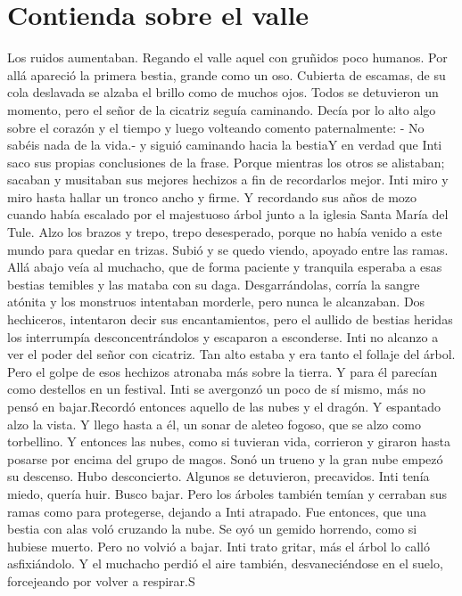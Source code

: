 
\chapter{Contienda sobre el valle}

Los ruidos aumentaban. Regando el valle aquel con gruñidos poco humanos. Por allá apareció la primera bestia, grande como un oso. Cubierta de escamas, de su cola deslavada se alzaba el brillo como de muchos ojos. Todos se detuvieron un momento, pero el señor de la cicatriz seguía caminando. Decía por lo alto algo sobre el corazón y el tiempo y luego volteando comento paternalmente: - No sabéis nada de la vida.- y siguió caminando hacia la bestiaY en verdad que Inti saco sus propias conclusiones de la frase. Porque mientras los otros se alistaban; sacaban y musitaban sus mejores hechizos a fin de recordarlos mejor. Inti miro y miro hasta hallar un tronco ancho y firme. Y recordando sus años de mozo cuando  había escalado por el majestuoso árbol junto a la iglesia Santa María del Tule. Alzo los brazos y trepo, trepo desesperado, porque no había venido a este mundo para quedar en trizas. Subió y se quedo viendo, apoyado entre las ramas. Allá abajo veía al muchacho, que de forma paciente y tranquila esperaba a esas bestias temibles y las mataba con su daga. Desgarrándolas, corría la sangre atónita y los monstruos intentaban morderle, pero nunca le alcanzaban. Dos hechiceros, intentaron decir sus encantamientos, pero el aullido de bestias heridas los interrumpía desconcentrándolos y escaparon a esconderse. Inti no alcanzo a ver el poder del señor con cicatriz. Tan alto estaba y era tanto el follaje del árbol. Pero el golpe de esos hechizos atronaba más sobre la tierra. Y para él parecían como destellos en un festival. Inti se avergonzó un poco de sí mismo, más no pensó en bajar.Recordó entonces aquello de las nubes y el dragón. Y espantado alzo la vista. Y llego hasta a él,  un sonar de aleteo fogoso, que se alzo como torbellino. Y entonces las nubes, como si tuvieran vida, corrieron y giraron hasta posarse por encima del grupo de magos. Sonó un trueno y la gran nube empezó su descenso. Hubo desconcierto. Algunos se detuvieron, precavidos. Inti tenía miedo, quería huir. Busco bajar. Pero los árboles también temían y cerraban sus ramas como para protegerse, dejando a Inti atrapado. Fue entonces, que una bestia con alas voló cruzando la nube. Se oyó un gemido horrendo, como si hubiese muerto. Pero no volvió a bajar. Inti trato gritar, más el árbol lo calló asfixiándolo. Y el muchacho perdió el aire también, desvaneciéndose en el suelo, forcejeando por volver a respirar.S

